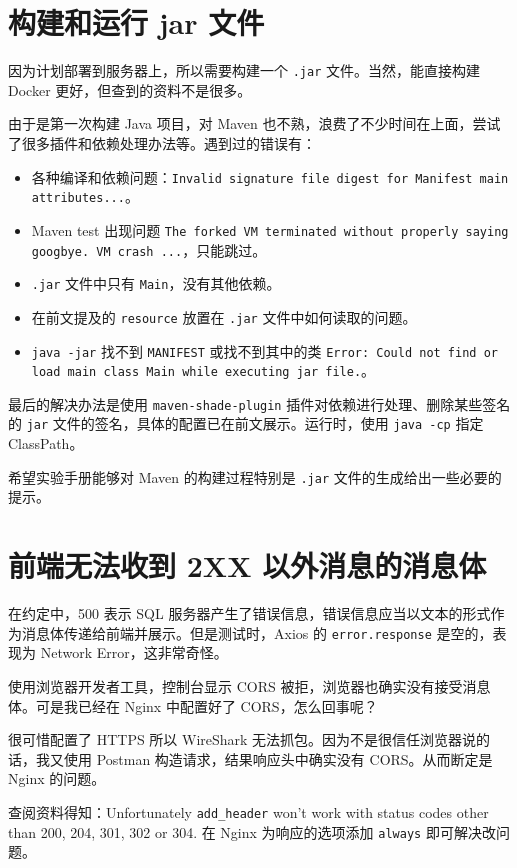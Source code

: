 \documentclass[a4paper,oneside]{ctexbook}
\begin{document}
\section{构建和运行 jar 文件}

因为计划部署到服务器上，所以需要构建一个 \verb|.jar| 文件。当然，能直接构建 Docker 更好，但查到的资料不是很多。

由于是第一次构建 Java 项目，对 Maven 也不熟，浪费了不少时间在上面，尝试了很多插件和依赖处理办法等。遇到过的错误有：

\begin{itemize}
    \item 各种编译和依赖问题：\verb|Invalid signature file digest for Manifest main attributes...|。
    \item Maven test 出现问题 \verb|The forked VM terminated without properly saying googbye. VM crash ...|，只能跳过。
    \item \verb|.jar| 文件中只有 \verb|Main|，没有其他依赖。
    \item 在前文提及的 \verb|resource| 放置在 \verb|.jar| 文件中如何读取的问题。
    \item \verb|java -jar| 找不到 \verb|MANIFEST| 或找不到其中的类 \verb|Error: Could not find or load main class Main while executing jar file.|。
\end{itemize}

最后的解决办法是使用 \verb|maven-shade-plugin| 插件对依赖进行处理、删除某些签名的 \verb|jar| 文件的签名，具体的配置已在前文展示。运行时，使用 \verb|java -cp| 指定 ClassPath。

希望实验手册能够对 Maven 的构建过程特别是 \verb|.jar| 文件的生成给出一些必要的提示。

\section{前端无法收到 2XX 以外消息的消息体}

在约定中，500 表示 SQL 服务器产生了错误信息，错误信息应当以文本的形式作为消息体传递给前端并展示。但是测试时，Axios 的 \verb|error.response| 是空的，表现为 Network Error，这非常奇怪。

使用浏览器开发者工具，控制台显示 CORS 被拒，浏览器也确实没有接受消息体。可是我已经在 Nginx 中配置好了 CORS，怎么回事呢？

很可惜配置了 HTTPS 所以 WireShark 无法抓包。因为不是很信任浏览器说的话，我又使用 Postman 构造请求，结果响应头中确实没有 CORS。从而断定是 Nginx 的问题。

查阅资料得知：Unfortunately \verb|add_header| won't work with status codes other than 200, 204, 301, 302 or 304. 在 Nginx 为响应的选项添加 \verb|always| 即可解决改问题。
\end{document}
